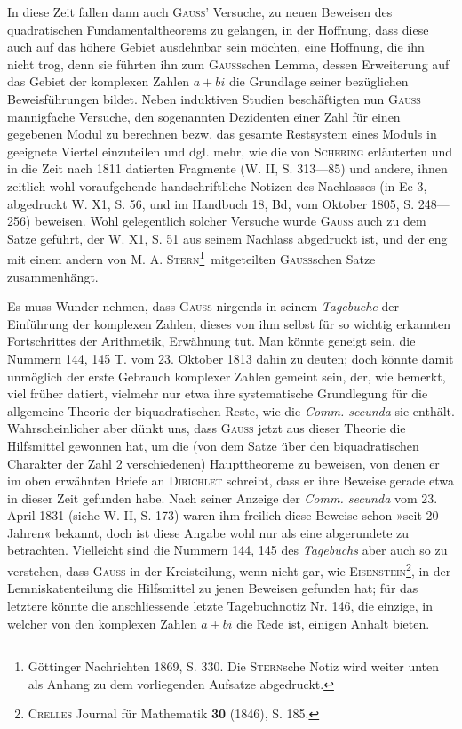 In diese Zeit fallen dann auch \textsc{Gauss}’ Versuche, zu neuen Beweisen des quadratischen Fundamentaltheorems zu gelangen, in der Hoffnung, dass diese auch auf das höhere Gebiet ausdehnbar sein möchten, eine Hoffnung, die ihn nicht trog, denn sie führten ihn zum \textsc{Gauss}schen Lemma, dessen Erweiterung auf das Gebiet der komplexen Zahlen \(a+bi\) die Grundlage seiner bezüglichen Beweisführungen bildet.
\newpage{}
\noindent\hspace*{\parindent}Neben induktiven Studien beschäftigten nun \textsc{Gauss} mannigfache Versuche, den sogenannten Dezidenten einer Zahl für einen gegebenen Modul zu berechnen bezw. das gesamte Restsystem eines Moduls in geeignete Viertel einzuteilen und dgl. mehr, wie die von \textsc{Schering} erläuterten und in die Zeit nach 1811 datierten Fragmente (W. II, S. 313—85) und andere, ihnen zeitlich wohl voraufgehende handschriftliche Notizen des Nachlasses (in Ec 3, abgedruckt W. X1, S. 56, und im Handbuch 18, Bd, vom Oktober 1805, S. 248—256) beweisen. Wohl gelegentlich solcher Versuche wurde \textsc{Gauss} auch zu dem Satze geführt, der W. X1, S. 51 aus seinem Nachlass abgedruckt ist, und der eng mit einem andern von M. A. \textsc{Stern}\footnote{Göttinger Nachrichten 1869, S. 330. Die \textsc{Stern}sche Notiz wird weiter unten als Anhang zu dem vorliegenden Aufsatze abgedruckt.}\ mitgeteilten \textsc{Gauss}schen Satze zusammenhängt.

Es muss Wunder nehmen, dass \textsc{Gauss} nirgends in seinem \textit{Tagebuche} der Einführung der komplexen Zahlen, dieses von ihm selbst für so wichtig erkannten Fortschrittes der Arithmetik, Erwähnung tut. Man könnte geneigt sein, die Nummern 144, 145 T. vom 23. Oktober 1813 dahin zu deuten; doch könnte damit unmöglich der erste Gebrauch komplexer Zahlen gemeint sein, der, wie bemerkt, viel früher datiert, vielmehr nur etwa ihre systematische Grundlegung für die allgemeine Theorie der biquadratischen Reste, wie die \textit{Comm. secunda} sie enthält. Wahrscheinlicher aber dünkt uns, dass \textsc{Gauss} jetzt aus dieser Theorie die Hilfsmittel gewonnen hat, um die (von dem Satze über den biquadratischen Charakter der Zahl 2 verschiedenen) Haupttheoreme zu beweisen, von denen er im oben erwähnten Briefe an \textsc{Dirichlet} schreibt, dass er ihre Beweise gerade etwa in dieser Zeit gefunden habe. Nach seiner Anzeige der \textit{Comm. secunda} vom 23. April 1831 (siehe W. II, S. 173) waren ihm freilich diese Beweise schon »seit 20 Jahren« bekannt, doch ist diese Angabe wohl nur als eine abgerundete zu betrachten. Vielleicht sind die Nummern 144, 145 des \textit{Tagebuchs} aber auch so zu verstehen, dass \textsc{Gauss} in der Kreisteilung, wenn nicht gar, wie \textsc{Eisenstein}\begingroup\renewcommand{\thefootnote}{**)}\footnote{\textsc{Crelles} Journal für Mathematik \textbf{30} (1846), S. 185.}\endgroup, in der Lemniskatenteilung die Hilfsmittel zu jenen Beweisen gefunden hat; für das letztere könnte die anschliessende letzte Tagebuchnotiz Nr. 146, die einzige, in welcher von den komplexen Zahlen \(a+bi\) die Rede ist, einigen Anhalt bieten.
